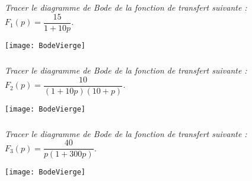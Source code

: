 \setcounter{exo}{0}
\subparagraph{}\textit{Tracer le diagramme de Bode de la fonction de transfert suivante : $F_1(p)=\dfrac{15}{1+10p}$.}
\begin{center}
\texttt{[image: BodeVierge]}
\end{center}

\subparagraph{}\textit{Tracer le diagramme de Bode de la fonction de transfert suivante : $F_2(p)=\dfrac{10}{\left(1+10p\right)\left(10+p\right)}$.}
\begin{center}
\texttt{[image: BodeVierge]}
\end{center}

\subparagraph{}\textit{Tracer le diagramme de Bode de la fonction de transfert suivante : $F_3(p)=\dfrac{40}{p\left(1+300p\right)}$.}

\begin{center}
\texttt{[image: BodeVierge]}
\end{center}